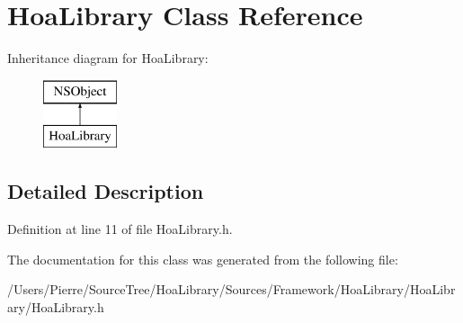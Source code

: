 \hypertarget{interface_hoa_library}{\section{Hoa\-Library Class Reference}
\label{interface_hoa_library}
}
Inheritance diagram for Hoa\-Library\-:\begin{figure}[H]
\begin{center}
\leavevmode
\includegraphics[height=2.000000cm]{interface_hoa_library}
\end{center}
\end{figure}


\subsection{Detailed Description}


Definition at line 11 of file Hoa\-Library.\-h.



The documentation for this class was generated from the following file\-:\begin{DoxyCompactItemize}
\item 
/\-Users/\-Pierre/\-Source\-Tree/\-Hoa\-Library/\-Sources/\-Framework/\-Hoa\-Library/\-Hoa\-Library/Hoa\-Library.\-h\end{DoxyCompactItemize}
